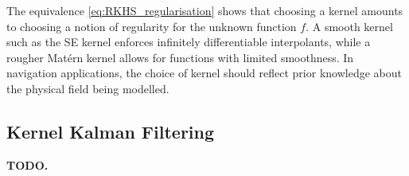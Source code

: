 \begin{remark}
    The equivalence \eqref{eq:RKHS_regularisation} shows that choosing a
    kernel amounts to choosing a notion of regularity for the unknown function
    $f$. A smooth kernel such as the SE kernel enforces infinitely
    differentiable interpolants, while a rougher Mat\'{e}rn kernel allows for
    functions with limited smoothness. In navigation applications, the choice
    of kernel should reflect prior knowledge about the physical field being
    modelled.
\end{remark}

\subsection{Kernel Kalman Filtering}
\label{sec:kernel_kalman}

\textbf{TODO.}
